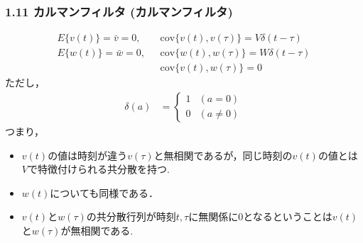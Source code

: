 \documentclass[10pt]{beamer}
\begin{document}
\begin{frame}[t]
\frametitle{1.11 カルマンフィルタ (カルマンフィルタ)}
 

\addtocounter{equation}{-3}
\begin{align}
     E \{ v(t) \} = \bar{v} = 0, & \ \ \ \mbox{cov}\{ v(t), v(\tau)\} = V \delta(t-\tau)
\\
     E \{ w(t) \} = \bar{w} = 0, & \ \ \ \mbox{cov}\{ w(t), w(\tau)\} = W \delta(t-\tau)
\\
                       & \ \ \ \mbox{cov} \{v(t), w(\tau) \} =0
\end{align}
ただし，
\begin{align}
	\delta(a)
	&= \left \{
		\begin{array}{ll}
			1 & (a =    0) \\
			0 & (a \neq 0)
		\end{array}
	   \right .
\end{align}
つまり，
\begin{itemize}
  \item $v(t)$の値は時刻が違う$v(\tau)$と無相関であるが，同じ時刻の$v(t)$の値とは$V$で特徴付けられる共分散を持つ.
  \item $w(t)$についても同様である．
  \item $v(t)$と$w(\tau)$の共分散行列が時刻$t,\tau$に無関係に$0$となるということは$v(t)$と$w(\tau)$が無相関である.
\end{itemize}
\end{frame}
\end{document}
